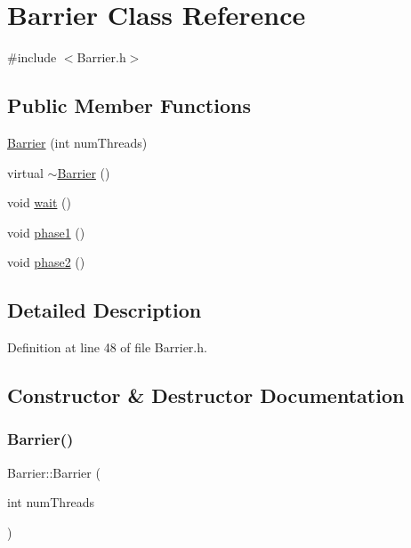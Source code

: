 \hypertarget{class_barrier}{}\section{Barrier Class Reference}
\label{class_barrier}


{\ttfamily \#include $<$Barrier.\+h$>$}

\subsection*{Public Member Functions}
\begin{DoxyCompactItemize}
\item 
\hyperlink{class_barrier_a7290fb8952d0f7779b8d6a7a34bbd407}{Barrier} (int num\+Threads)
\item 
virtual \hyperlink{class_barrier_a401f40e73302009b305904ffc7825304}{$\sim$\+Barrier} ()
\item 
void \hyperlink{class_barrier_a83a9d2e85e98b3d2081538bf0da29b60}{wait} ()
\item 
void \hyperlink{class_barrier_aef1a70f9dfdaa5f0a10274a46a040f8d}{phase1} ()
\item 
void \hyperlink{class_barrier_ac91842c7f750131e80a037a02feb5486}{phase2} ()
\end{DoxyCompactItemize}


\subsection{Detailed Description}


Definition at line 48 of file Barrier.\+h.



\subsection{Constructor \& Destructor Documentation}
\mbox{\label{class_barrier_a7290fb8952d0f7779b8d6a7a34bbd407}} 
\subsubsection{\texorpdfstring{Barrier()}{Barrier()}}
{\footnotesize\ttfamily Barrier\+::\+Barrier (\begin{DoxyParamCaption}\item[{int}]{num\+Threads }\end{DoxyParamCaption})}



